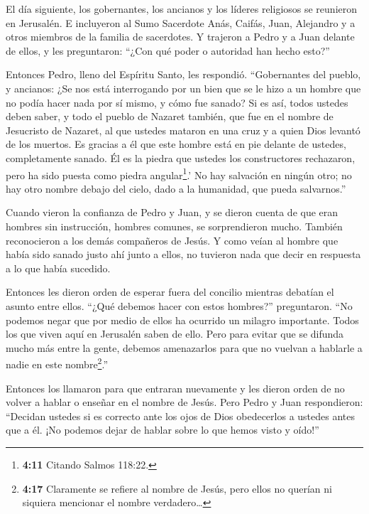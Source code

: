  El día siguiente, los gobernantes, los ancianos y los
líderes religiosos se reunieron en Jerusalén.  E incluyeron
al Sumo Sacerdote Anás, Caifás, Juan, Alejandro y a otros miembros de la
familia de sacerdotes.  Y trajeron a Pedro y a Juan delante
de ellos, y les preguntaron: ``¿Con qué poder o autoridad han hecho
esto?''

 Entonces Pedro, lleno del Espíritu Santo, les respondió.
``Gobernantes del pueblo, y ancianos:  ¿Se nos está
interrogando por un bien que se le hizo a un hombre que no podía hacer
nada por sí mismo, y cómo fue sanado?  Si es así, todos
ustedes deben saber, y todo el pueblo de Nazaret también, que fue en el
nombre de Jesucristo de Nazaret, al que ustedes mataron en una cruz y a
quien Dios levantó de los muertos. Es gracias a él que este hombre está
en pie delante de ustedes, completamente sanado.  Él es la
piedra que ustedes los constructores rechazaron, pero ha sido puesta
como piedra angular\footnote{\textbf{4:11} Citando Salmos 118:22.}.'
 No hay salvación en ningún otro; no hay otro nombre debajo
del cielo, dado a la humanidad, que pueda salvarnos.''

 Cuando vieron la confianza de Pedro y Juan, y se dieron
cuenta de que eran hombres sin instrucción, hombres comunes, se
sorprendieron mucho. También reconocieron a los demás compañeros de
Jesús.  Y como veían al hombre que había sido sanado justo
ahí junto a ellos, no tuvieron nada que decir en respuesta a lo que
había sucedido.

 Entonces les dieron orden de esperar fuera del concilio
mientras debatían el asunto entre ellos.  ``¿Qué debemos
hacer con estos hombres?'' preguntaron. ``No podemos negar que por medio
de ellos ha ocurrido un milagro importante. Todos los que viven aquí en
Jerusalén saben de ello.  Pero para evitar que se difunda
mucho más entre la gente, debemos amenazarlos para que no vuelvan a
hablarle a nadie en este nombre\footnote{\textbf{4:17} Claramente se
  refiere al nombre de Jesús, pero ellos no querían ni siquiera
  mencionar el nombre verdadero\ldots{}}.''

 Entonces los llamaron para que entraran nuevamente y les
dieron orden de no volver a hablar o enseñar en el nombre de Jesús.
 Pero Pedro y Juan respondieron: ``Decidan ustedes si es
correcto ante los ojos de Dios obedecerlos a ustedes antes que a él.
 ¡No podemos dejar de hablar sobre lo que hemos visto y
oído!''

